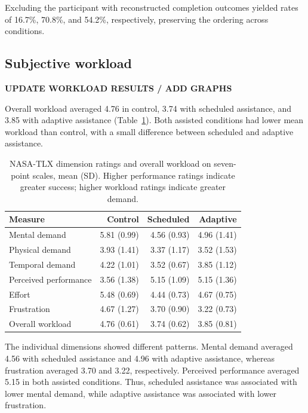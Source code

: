 \documentclass[sigconf]{aamas}
\begin{document}
Excluding the participant with reconstructed completion outcomes yielded rates of 16.7\%, 70.8\%, and 54.2\%, respectively, preserving the ordering across conditions.

\subsection{Subjective workload}

\textbf{UPDATE WORKLOAD RESULTS / ADD GRAPHS}

Overall workload averaged 4.76 in control, 3.74 with scheduled assistance, and 3.85 with adaptive assistance (Table~\ref{tab:workload}). Both assisted conditions had lower mean workload than control, with a small difference between scheduled and adaptive assistance.

\begin{table}[t]
\centering
\caption{NASA-TLX dimension ratings and overall workload on seven-point scales, mean (SD). Higher performance ratings indicate greater success; higher workload ratings indicate greater demand.}
\label{tab:workload}
\begingroup\small\setlength{\tabcolsep}{4pt}
\begin{tabular}{lrrr}
\toprule
Measure & Control & Scheduled & Adaptive \\
\midrule
Mental demand & 5.81 (0.99) & 4.56 (0.93) & 4.96 (1.41) \\
Physical demand & 3.93 (1.41) & 3.37 (1.17) & 3.52 (1.53) \\
Temporal demand & 4.22 (1.01) & 3.52 (0.67) & 3.85 (1.12) \\
Perceived performance & 3.56 (1.38) & 5.15 (1.09) & 5.15 (1.36) \\
Effort & 5.48 (0.69) & 4.44 (0.73) & 4.67 (0.75) \\
Frustration & 4.67 (1.27) & 3.70 (0.90) & 3.22 (0.73) \\
Overall workload & 4.76 (0.61) & 3.74 (0.62) & 3.85 (0.81) \\
\bottomrule
\end{tabular}
\endgroup
\end{table}

The individual dimensions showed different patterns. Mental demand averaged 4.56 with scheduled assistance and 4.96 with adaptive assistance, whereas frustration averaged 3.70 and 3.22, respectively. Perceived performance averaged 5.15 in both assisted conditions. Thus, scheduled assistance was associated with lower mental demand, while adaptive assistance was associated with lower frustration.
\end{document}
